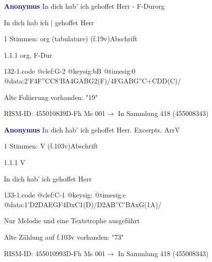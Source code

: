 \documentclass[twocolumn, 12pt]{book}
\begin{document}
\par \vspace{16pt} \textcolor{darkblue}{\textbf{Anonymus  }}\hfillplus{\textbf{[132]}}\newline In dich hab' ich gehoffet Herr - F-Dur\newline org
\par \begin{itshape}[f.19v, at left:] In dich hab ich | gehoffet Herr\end{itshape} 
\par \textcolor{darkblue}{}  1 Stimmen: org (tabulature)  (f.19v)\newline Abschrift
\par 1.1.1  org, F-Dur  
\begin{filecontents*}{132-1.code}
@clef:G-2
@keysig:bB
@timesig:0
@data:2'F4F''CC{8'BA}4GABG2(F)/4FGABG''C+CDD(C)/
\end{filecontents*}
\newline %
\par Alte Foliierung vorhanden: "19"
\par RISM-ID: 455010839\newline D-Fh  Ms 001\newline $\rightarrow$ In Sammlung 418 (455008343)
      
\par \vspace{16pt} \textcolor{darkblue}{\textbf{Anonymus  }}\hfillplus{\textbf{[133]}}\newline In dich hab' ich gehoffet Herr. Excerpts. Arr\newline V
\par \begin{itshape}\end{itshape} 
\par \textcolor{darkblue}{}  1 Stimmen: V  (f.103v)\newline Abschrift
\par 1.1.1  V\newline \begin{footnotesize} In dich hab' ich gehoffet Herr \end{footnotesize}  
\begin{filecontents*}{133-1.code}
@clef:C-1
@keysig:
@timesig:c
@data:1'D2DAEGF4DxC1(D)/D2AB''C'BAxG(1A)/
\end{filecontents*}
\newline %
\par Nur Melodie und eine Textstrophe ausgeführt
\par Alte Zählung auf f.103v vorhanden: "73"
\par RISM-ID: 455010993\newline D-Fh  Ms 001\newline $\rightarrow$ In Sammlung 418 (455008343)
      
\end{document}
